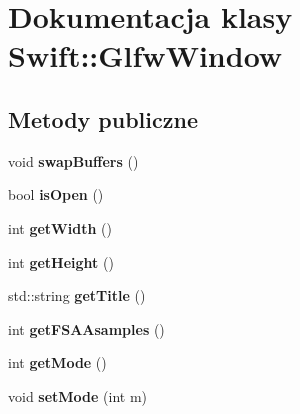 \hypertarget{class_swift_1_1_glfw_window}{\section{Dokumentacja klasy Swift\-:\-:Glfw\-Window}
\label{class_swift_1_1_glfw_window}
}
\subsection*{Metody publiczne}
\begin{DoxyCompactItemize}
\item 
\hypertarget{class_swift_1_1_glfw_window_a293e3df4b7f81dcd5a2e293d0c0a0e6e}{void {\bfseries swap\-Buffers} ()}\label{class_swift_1_1_glfw_window_a293e3df4b7f81dcd5a2e293d0c0a0e6e}

\item 
\hypertarget{class_swift_1_1_glfw_window_a3e2d2767424b07351f6bd31b936c5fb0}{bool {\bfseries is\-Open} ()}\label{class_swift_1_1_glfw_window_a3e2d2767424b07351f6bd31b936c5fb0}

\item 
\hypertarget{class_swift_1_1_glfw_window_a96d3d541d3f7988e2575adbfa2dca51f}{int {\bfseries get\-Width} ()}\label{class_swift_1_1_glfw_window_a96d3d541d3f7988e2575adbfa2dca51f}

\item 
\hypertarget{class_swift_1_1_glfw_window_ac563261a4c5d7df87c36638e9d6edae1}{int {\bfseries get\-Height} ()}\label{class_swift_1_1_glfw_window_ac563261a4c5d7df87c36638e9d6edae1}

\item 
\hypertarget{class_swift_1_1_glfw_window_a2b0892ae66e4daef8489de02539e679d}{std\-::string {\bfseries get\-Title} ()}\label{class_swift_1_1_glfw_window_a2b0892ae66e4daef8489de02539e679d}

\item 
\hypertarget{class_swift_1_1_glfw_window_af165765a36d8dc9c471c081052644f1c}{int {\bfseries get\-F\-S\-A\-Asamples} ()}\label{class_swift_1_1_glfw_window_af165765a36d8dc9c471c081052644f1c}

\item 
\hypertarget{class_swift_1_1_glfw_window_ab6ef902af7b79a40e01df82c165a499f}{int {\bfseries get\-Mode} ()}\label{class_swift_1_1_glfw_window_ab6ef902af7b79a40e01df82c165a499f}

\item 
\hypertarget{class_swift_1_1_glfw_window_af8c667c8845cf9d20614a19d6b6f2a92}{void {\bfseries set\-Mode} (int m)}\label{class_swift_1_1_glfw_window_af8c667c8845cf9d20614a19d6b6f2a92}


\end{DoxyCompactItemize}
